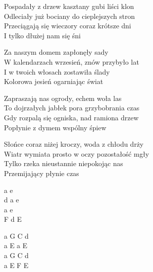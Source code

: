 \begin{text}
    Pospadały z drzew kasztany gubi liści klon\\
    Odleciały już bociany do cieplejszych stron\\
    Przeciągają się wieczory coraz krótsze dni\\
    I tylko dłużej nam się śni

    \vin Za naszym domem zapłonęły sady\\
    \vin W kalendarzach wrzesień, znów przybyło lat\\
    \vin I w twoich włosach zostawiła ślady\\
    \vin Kolorowa jesień ogarniając świat

    Zapraszają nas ogrody, echem woła las\\
    To dojrzałych jabłek pora grzybobrania czas\\
    Gdy rozpalą się ogniska, nad ramiona drzew\\
    Popłynie z dymem wspólny śpiew

    Słońce coraz niżej kroczy, woda z chłodu drży\\
    Wiatr wymiata prosto w oczy pozostałość mgły\\
    Tylko rzeka nieustannie niepokojąc nas\\
    Przemijający płynie czas
\end{text}
\begin{chord}
    a e\\
    d a e\\
    a e\\
    F d E

    a G C d\\
    a E a E\\
    a G C d\\
    a E F E
\end{chord}